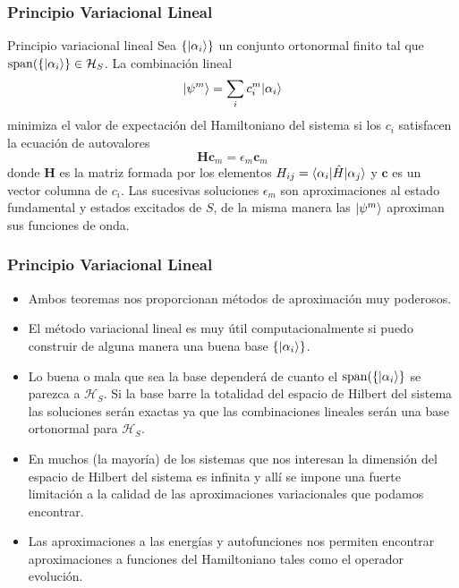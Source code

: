 \documentclass{beamer}
\begin{document}
\begin{frame}
    \frametitle{Principio Variacional Lineal}
    
    \begin{block}{Principio variacional lineal}
        Sea $\{| \alpha_i \rangle\}$ un conjunto ortonormal finito tal que $\mathrm{span}(\{| \alpha_i \rangle\}\in \mathcal{H}_S$. La combinación lineal
        \[ | \psi^m \rangle = \sum_i c^m_i | \alpha_i \rangle \] minimiza el valor de expectación del Hamiltoniano del sistema si los $c_i$ satisfacen la ecuación de autovalores
        \[ \mathbf{H}\mathbf{c}_m=\epsilon_m \mathbf{c}_m \]
        donde $\mathbf{H}$ es la matriz formada por los elementos $H_{ij}=\langle \alpha_i |\hat{H}| \alpha_j \rangle$ y $\mathbf{c}$ es un vector columna de $c_i$. Las sucesivas soluciones $\epsilon_m$ son aproximaciones al estado fundamental y estados excitados de $S$, de la misma manera las $| \psi^m \rangle$ aproximan sus funciones de onda.
    \end{block}

\end{frame}

\begin{frame}
    \frametitle{Principio Variacional Lineal}
    
    \begin{itemize}
        \item Ambos teoremas nos proporcionan métodos de aproximación muy poderosos.
        \item El método variacional lineal es muy útil computacionalmente si puedo construir de alguna manera una buena base $\{| \alpha_i \rangle\}$.
        \item Lo buena o mala que sea la base dependerá de cuanto el $\mathrm{span}(\{| \alpha_i \rangle\}$ se parezca a $\mathcal{H}_S$. Si la base barre la totalidad del espacio de Hilbert del sistema las soluciones serán exactas ya que las combinaciones lineales serán una base ortonormal para $\mathcal{H}_S$.
        \item En muchos (la mayoría) de los sistemas que nos interesan la dimensión del espacio de Hilbert del sistema es infinita y allí se impone una fuerte limitación a la calidad de las aproximaciones variacionales que podamos encontrar.
        \item Las aproximaciones a las energías y autofunciones nos permiten encontrar aproximaciones a funciones del Hamiltoniano tales como el operador evolución.
    \end{itemize}

\end{frame}
\end{document}
